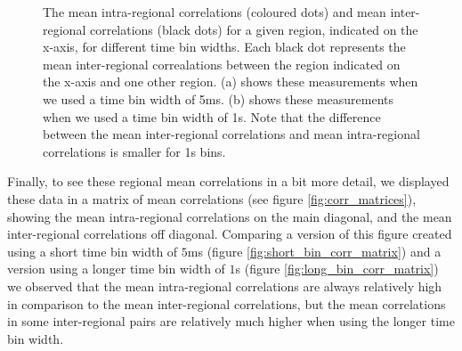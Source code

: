 \begin{figure}[h]
\begin{subfigure}[h]{\linewidth}
      \label{fig:long_bin_corr_comp}
    \end{subfigure}
    \caption{The mean intra-regional correlations (coloured dots) and mean inter-regional correlations (black dots) for a given region, indicated on the x-axis, for different time bin widths. Each black dot represents the mean inter-regional correalations between the region indicated on the x-axis and one other region. (a) shows these measurements when we used a time bin width of 5ms. (b) shows these measurements when we used a time bin width of 1s. Note that the difference between the mean inter-regional correlations and mean intra-regional correlations is smaller for 1s bins.}
    \label{fig:corr_comps}
  \end{figure}

  Finally, to see these regional mean correlations in a bit more detail, we displayed these data in a matrix of mean correlations (see figure \ref{fig:corr_matrices}), showing the mean intra-regional correlations on the main diagonal, and the mean inter-regional correlations off diagonal. Comparing a version of this figure created using a short time bin width of $5$ms (figure \ref{fig:short_bin_corr_matrix}) and a version using a longer time bin width of $1$s (figure \ref{fig:long_bin_corr_matrix}) we observed that the mean intra-regional correlations are always relatively high in comparison to the mean inter-regional correlations, but the mean correlations in some inter-regional pairs are relatively much higher when using the longer time bin width.

